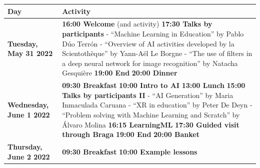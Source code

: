 \documentclass[11pt]{article}
\begin{document}
\begin{table}
    \renewcommand{\arraystretch}{1.4}
     \begin{center}
      \begin{tabular}{m{6cm} m{8cm}} %
        \hline
        \rowcolor{gray!35}\centering\arraybackslash\textbf{Day} & \centering\arraybackslash\textbf{Activity} \\
        \hline%
        
        \centering\textbf{Tuesday, May 31 2022} &  \textbf{16:00 Welcome} (and activity) \newline
        \textbf{17:30 Talks by participants} \newline
        - ``Machine Learning in Education'' by Pablo Dúo Terrón \newline
        - ``Overview of AI activities developed by la Scientothèque'' by Yann-Aël Le Borgne \newline
        - ``The use of filters in a deep neural network for image recognition'' by Natacha Gesquière
        \newline
        \textbf{19:00 End} \newline
        \textbf{20:00 Dinner}
        \\ %
        \rowcolor{gray!15}
        \centering\textbf{Wednesday, June 1 2022} & \textbf{09:30 Breakfast} \newline \textbf{10:00 Intro to AI} \newline \textbf{13:00 Lunch} \newline 
        \textbf{15:00 Talks by participants II} \newline
        - ``AI Generation'' by Maria Inmaculada Caruana\newline
        - ``XR in education'' by Peter De Deyn \newline
        - ``Problem solving with Machine Learning and Scratch'' by Álvaro Molina
        \newline
        \textbf{16:15 LearningML} \newline
        \textbf{17:30 Guided visit through Braga} \newline
        \textbf{19:00 End} \newline
        \textbf{20:00 Banket}
        \\ 
        \centering\textbf{Thursday, June 2 2022} & \textbf{09:30 Breakfast} \newline \textbf{10:00 Example lessons} %

\end{tabular}
\end{center}
\end{table}
\end{document}
